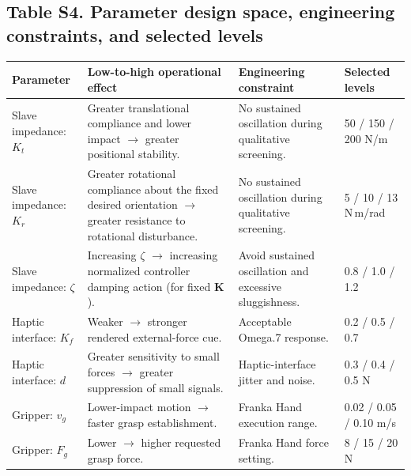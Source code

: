 \documentclass[11pt]{article}
\begin{document}
\subsection*{Table S4. Parameter design space, engineering constraints, and selected levels}
\small
\renewcommand{\arraystretch}{1.16}
\begin{longtable}{p{}p{}p{}p{}}
\toprule
Parameter & Low-to-high operational effect & Engineering constraint & Selected levels \\
\midrule
Slave impedance: $K_t$ & Greater translational compliance and lower impact $\rightarrow$ greater positional stability. & No sustained oscillation during qualitative screening. & 50 / 150 / 200 N/m \\
Slave impedance: $K_r$ & Greater rotational compliance about the fixed desired orientation $\rightarrow$ greater resistance to rotational disturbance. & No sustained oscillation during qualitative screening. & 5 / 10 / 13 N\,m/rad \\
Slave impedance: $\zeta$ & Increasing $\zeta$ $\rightarrow$ increasing normalized controller damping action (for fixed $\mathbf{K}$). & Avoid sustained oscillation and excessive sluggishness. & 0.8 / 1.0 / 1.2 \\
Haptic interface: $K_f$ & Weaker $\rightarrow$ stronger rendered external-force cue. & Acceptable Omega.7 response. & 0.2 / 0.5 / 0.7 \\
Haptic interface: $d$ & Greater sensitivity to small forces $\rightarrow$ greater suppression of small signals. & Haptic-interface jitter and noise. & 0.3 / 0.4 / 0.5 N \\
Gripper: $v_g$ & Lower-impact motion $\rightarrow$ faster grasp establishment. & Franka Hand execution range. & 0.02 / 0.05 / 0.10 m/s \\
Gripper: $F_g$ & Lower $\rightarrow$ higher requested grasp force. & Franka Hand force setting. & 8 / 15 / 20 N \\
\bottomrule
\end{longtable}
\normalsize
\end{document}
